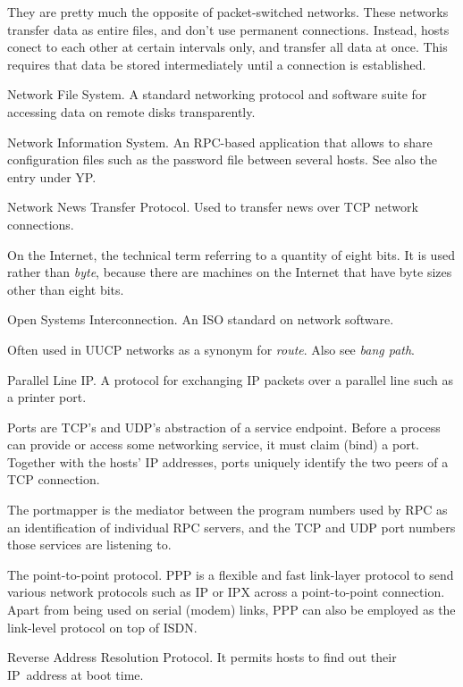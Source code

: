 \documentclass[11pt,makeidx]{report}
\def\emph#1{{\em{#1}}}
\begin{document}
{\begin{dispitems}
	They are pretty much the opposite of packet-switched networks.
	These networks transfer data as entire files, and don't
	use permanent connections. Instead, hosts conect to each other
	at certain intervals only, and transfer all data at once.
	This requires that data be stored intermediately until a
	connection is established.

\ditem[NFS]
        Network File System. A standard networking protocol and
        software suite for accessing data on remote disks
        transparently.

\ditem[NIS]
        Network Information System. An RPC-based application that
        allows to share configuration files such as the password file
        between several hosts. See also the entry under YP.

\ditem[NNTP]
        Network News Transfer Protocol. Used to transfer news over
        TCP network connections.

\ditem[octet]
	On the Internet, the technical term referring to a quantity of
	eight bits. It is used rather than \emph{byte}, because there
	are machines on the Internet that have byte sizes other than eight
	bits.

\ditem[OSI]
	Open Systems Interconnection. An ISO standard on network software.

\ditem[path]
	Often used in UUCP networks as a synonym for \emph{route}. Also
	see \emph{bang path}.

\ditem[PLIP]
	Parallel Line IP. A protocol for exchanging IP packets over
	a parallel line such as a printer port.

	Ports are TCP's and UDP's abstraction of a service endpoint.
	Before a process can provide or access some networking service,
	it must claim (bind) a port. Together with the hosts' IP
	addresses, ports uniquely identify the two peers of a TCP connection.

\ditem[portmapper]
	The portmapper is the mediator between the program numbers used
	by RPC as an identification of individual RPC servers, and the
	TCP and UDP port numbers those services are listening to.

\ditem[PPP]
	The point-to-point protocol. PPP is a flexible and
	fast link-layer protocol to send various network protocols
	such as IP or IPX across a point-to-point connection.  Apart
	from being used on serial (modem) links, PPP can also be
	employed as the link-level protocol on top of ISDN.

\ditem[RARP]
        Reverse Address Resolution Protocol. It permits hosts to
        find out their IP~address at boot time.


\end{dispitems}}
\end{document}
